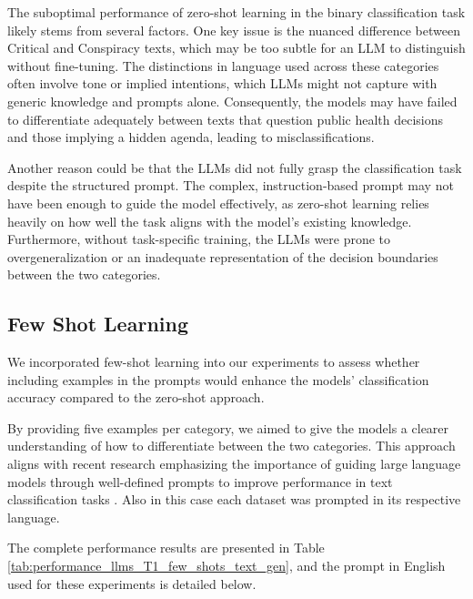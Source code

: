 \documentclass{Configuration_Files/PoliMi3i_thesis}
\begin{document}
The suboptimal performance of zero-shot learning in the binary classification task likely stems from several factors. One key issue is the nuanced difference between Critical and Conspiracy texts, which may be too subtle for an LLM to distinguish without fine-tuning. The distinctions in language used across these categories often involve tone or implied intentions, which LLMs might not capture with generic knowledge and prompts alone. Consequently, the models may have failed to differentiate adequately between texts that question public health decisions and those implying a hidden agenda, leading to misclassifications.

Another reason could be that the LLMs did not fully grasp the classification task despite the structured prompt. The complex, instruction-based prompt may not have been enough to guide the model effectively, as zero-shot learning relies heavily on how well the task aligns with the model’s existing knowledge. Furthermore, without task-specific training, the LLMs were prone to overgeneralization or an inadequate representation of the decision boundaries between the two categories.

\subsection{Few Shot Learning}
We incorporated few-shot learning into our experiments to assess whether including examples in the prompts would enhance the models' classification accuracy compared to the zero-shot approach. 

By providing five examples per category, we aimed to give the models a clearer understanding of how to differentiate between the two categories. This approach aligns with recent research emphasizing the importance of guiding large language models through well-defined prompts to improve performance in text classification tasks \cite{peskine2023definitions}. Also in this case each dataset was prompted in its respective language.

The complete performance results are presented in Table \ref{tab:performance_llms_T1_few_shots_text_gen}, and the prompt in English used for these experiments is detailed below.
\end{document}
